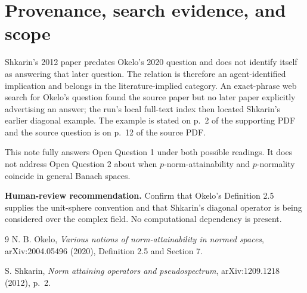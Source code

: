 \documentclass[11pt]{article}
\begin{document}
\section*{Provenance, search evidence, and scope}
Shkarin's 2012 paper predates Okelo's 2020 question and does not identify
itself as answering that later question. The relation is therefore an
agent-identified implication and belongs in the literature-implied category.
An exact-phrase web search for Okelo's question found the source paper but no
later paper explicitly advertising an answer; the run's local full-text index
then located Shkarin's earlier diagonal example. The example is stated on
p.~2 of the supporting PDF and the source question is on p.~12 of the source
PDF.

This note fully answers Open Question 1 under both possible readings. It does
not address Open Question 2 about when $p$-norm-attainability and
$p$-normality coincide in general Banach spaces.

\textbf{Human-review recommendation.} Confirm that Okelo's Definition 2.5
supplies the unit-sphere convention and that Shkarin's diagonal operator is
being considered over the complex field. No computational dependency is
present.

\begin{thebibliography}{9}
N. B. Okelo,
\emph{Various notions of norm-attainability in normed spaces},
arXiv:2004.05496 (2020), Definition 2.5 and Section 7.

S. Shkarin,
\emph{Norm attaining operators and pseudospectrum},
arXiv:1209.1218 (2012), p.~2.
\end{thebibliography}
\end{document}
